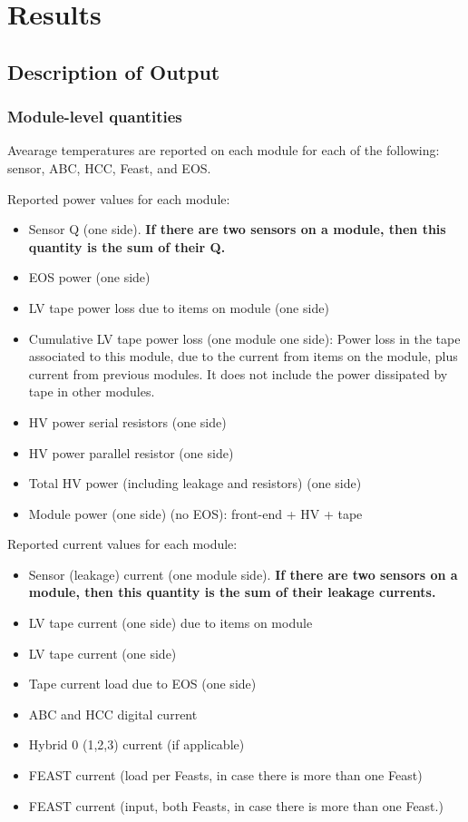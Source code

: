 
\newcommand{\mry}[2]{
\multirow{#1}{*}{Year #2}
}

\section{Results}

\subsection{Description of Output}
\label{description_of_output}
\subsubsection{Module-level quantities}
Avearage temperatures are reported on each module for each of the following: sensor, ABC, HCC, Feast,
and EOS.

Reported power values for each module: 
\begin{itemize}
\setlength\itemsep{0.0em}
\item Sensor Q (one side). {\bf If there are two sensors on a module, then this quantity is the sum of
their Q.}
\item EOS power (one side)
\item LV tape power loss due to items on module (one side)
\item Cumulative LV tape power loss (one module one side):
Power loss in the tape associated to this module, due to the current from items on the module, plus
current from previous modules. It does not include the power dissipated by tape in other modules.
\item HV power serial resistors (one side)
\item HV power parallel resistor (one side)
\item Total HV power (including leakage and resistors) (one side)
\item Module power (one side) (no EOS): front-end + HV + tape
\end{itemize}

Reported current values for each module:
\begin{itemize}
\setlength\itemsep{0.0em}
\item Sensor (leakage) current (one module side). {\bf If there are two sensors on a module, then this
quantity is the sum of their leakage currents.}
\item LV tape current (one side) due to items on module
\item LV tape current (one side)
\item Tape current load due to EOS (one side)
\item ABC and HCC digital current
\item Hybrid 0 (1,2,3) current (if applicable)
\item FEAST current (load per Feasts, in case there is more than one Feast)
\item FEAST current (input, both Feasts, in case there is more than one Feast.)
\end{itemize}

